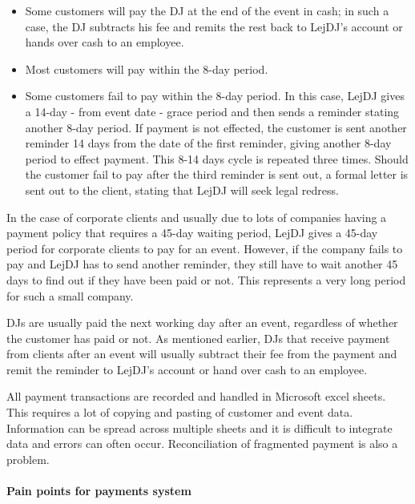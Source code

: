 \documentclass[envcountsame]{llncs}
\begin{document}
\begin{itemize}
\item Some customers will pay the DJ at the end of the event in cash;
  in such a case, the DJ subtracts his fee and remits the rest back to
  LejDJ’s account or hands over cash to an employee.
\item Most customers will pay within the 8-day period.
\item Some customers fail to pay within the 8-day period. In this
  case, LejDJ gives a 14-day - from event date - grace period and then
  sends a reminder stating another 8-day period. If payment is not
  effected, the customer is sent another reminder 14 days from the
  date of the first reminder, giving another 8-day period to effect
  payment. This 8-14 days cycle is repeated three times.  Should the
  customer fail to pay after the third reminder is sent out, a formal
  letter is sent out to the client, stating that LejDJ will seek legal
  redress.
\end{itemize}

In the case of corporate clients and usually due to lots of companies
having a payment policy that requires a 45-day waiting period, LejDJ
gives a 45-day period for corporate clients to pay for an event.
However, if the company fails to pay and LejDJ has to send another
reminder, they still have to wait another 45 days to find out if they
have been paid or not. This represents a very long period for such a
small company.

DJs are usually paid the next working day after an event, regardless
of whether the customer has paid or not. As mentioned earlier, DJs
that receive payment from clients after an event will usually subtract
their fee from the payment and remit the reminder to LejDJ’s account
or hand over cash to an employee.

All payment transactions are recorded and handled in Microsoft excel
sheets. This requires a lot of copying and pasting of customer and
event data. Information can be spread across multiple sheets and it is
difficult to integrate data and errors can often occur. Reconciliation
of fragmented payment is also a problem.

\paragraph{Pain points for payments system}
\end{document}
